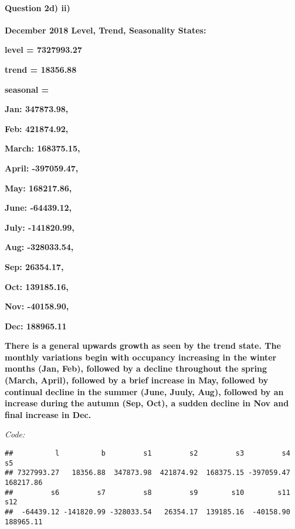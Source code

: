 \documentclass[]{article}
\newenvironment{Shaded}{\begin{snugshade}}{\end{snugshade}}
\newcommand{\DecValTok}[1]{\textcolor[rgb]{0.00,0.00,0.81}{#1}}
\newcommand{\NormalTok}[1]{#1}
\newcommand{\OperatorTok}[1]{\textcolor[rgb]{0.81,0.36,0.00}{\textbf{#1}}}
\let\oldparagraph\paragraph
\renewcommand{\paragraph}[1]{\oldparagraph{#1}\mbox{}}
\begin{document}
\hypertarget{question-2d-ii}{%
\paragraph{Question 2d) ii)}\label{question-2d-ii}}

\textbf{December 2018 Level, Trend, Seasonality States:}

\textbf{level = 7327993.27}

\textbf{trend = 18356.88}

\textbf{seasonal = }

\textbf{Jan: 347873.98, }

\textbf{Feb: 421874.92, }

\textbf{March: 168375.15, }

\textbf{April: -397059.47, }

\textbf{May: 168217.86, }

\textbf{June: -64439.12, }

\textbf{July: -141820.99, }

\textbf{Aug: -328033.54, }

\textbf{Sep: 26354.17, }

\textbf{Oct: 139185.16, }

\textbf{Nov: -40158.90, }

\textbf{Dec: 188965.11}

\textbf{There is a general upwards growth as seen by the trend state.
The monthly variations begin with occupancy increasing in the winter
months (Jan, Feb), followed by a decline throughout the spring (March,
April), followed by a brief increase in May, followed by continual
decline in the summer (June, Juuly, Aug), followed by an increase during
the autumn (Sep, Oct), a sudden decline in Nov and final increase in
Dec.}

\emph{Code:}

\begin{Shaded}
\end{Shaded}

\begin{verbatim}
##          l          b         s1         s2         s3         s4         s5 
## 7327993.27   18356.88  347873.98  421874.92  168375.15 -397059.47  168217.86 
##         s6         s7         s8         s9        s10        s11        s12 
##  -64439.12 -141820.99 -328033.54   26354.17  139185.16  -40158.90  188965.11
\end{verbatim}
\end{document}
